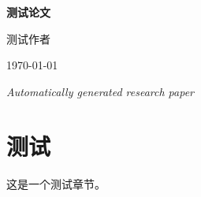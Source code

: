 \documentclass[12pt]{article}
\begin{document}
\begin{titlepage}
    \centering
    \vspace*{2cm}
    {\Huge\bfseries 测试论文\par}
    \vspace{1.5cm}
    {\large 测试作者\par}
    \vspace{0.5cm}
    {\large \today\par}
    \vfill
    {\large \textit{Automatically generated research paper}\par}
\end{titlepage}

\begin{abstract}
This paper presents research findings and analysis in the field of 测试论文. 
The content has been automatically generated and compiled into a professional academic format.
\end{abstract}

\tableofcontents
\newpage

\section{测试}
这是一个测试章节。



\end{document}

